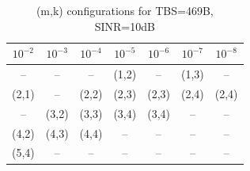 \begin{table}[ht]
\centering
\caption{(m,k) configurations for TBS=469B, SINR=10dB}
\label{tab:conf_{469B_10dB}}
\begin{tabular}{ccccccc}
\hline
$10^{-2}$ & $10^{-3}$ & $10^{-4}$ & $10^{-5}$ & $10^{-6}$ & $10^{-7}$ & $10^{-8}$ \\ \hline
-- & -- & -- & (1,2) & -- & (1,3) & -- \\
(2,1) & -- & (2,2) & (2,3) & (2,3) & (2,4) & (2,4) \\
-- & (3,2) & (3,3) & (3,4) & (3,4) & -- & -- \\
(4,2) & (4,3) & (4,4) & -- & -- & -- & -- \\
(5,4) & -- & -- & -- & -- & -- & -- \\
\hline
\end{tabular}
\end{table}